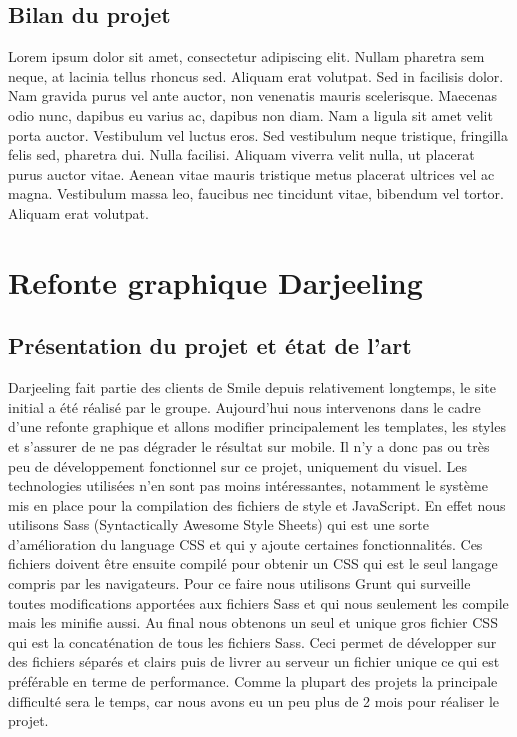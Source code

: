 \documentclass[a4paper,11pt,twoside]{report}
\begin{document}
    \subsection*{Bilan du projet}
    Lorem ipsum dolor sit amet, consectetur adipiscing elit. Nullam pharetra sem neque, at lacinia tellus rhoncus sed. Aliquam erat volutpat. Sed in facilisis dolor. Nam gravida purus vel ante auctor, non venenatis mauris scelerisque. Maecenas odio nunc, dapibus eu varius ac, dapibus non diam. Nam a ligula sit amet velit porta auctor. Vestibulum vel luctus eros. Sed vestibulum neque tristique, fringilla felis sed, pharetra dui. Nulla facilisi. Aliquam viverra velit nulla, ut placerat purus auctor vitae. Aenean vitae mauris tristique metus placerat ultrices vel ac magna. Vestibulum massa leo, faucibus nec tincidunt vitae, bibendum vel tortor. Aliquam erat volutpat.

    \newpage
    
  \section{Refonte graphique Darjeeling}
    \subsection*{Présentation du projet et état de l'art}
    Darjeeling fait partie des clients de Smile depuis relativement longtemps, le site initial a été réalisé par le groupe. Aujourd'hui nous intervenons dans le cadre d'une refonte graphique et allons modifier principalement les templates, les styles et s'assurer de ne pas dégrader le résultat sur mobile. Il n'y a donc pas ou très peu de développement fonctionnel sur ce projet, uniquement du visuel. Les technologies utilisées n'en sont pas moins intéressantes, notamment le système mis en place pour la compilation des fichiers de style et JavaScript. En effet nous utilisons Sass (Syntactically Awesome Style Sheets) qui est une sorte d'amélioration du language CSS et qui y ajoute certaines fonctionnalités. Ces fichiers doivent être ensuite compilé pour obtenir un CSS qui est le seul langage compris par les navigateurs. Pour ce faire nous utilisons Grunt qui surveille toutes modifications apportées aux fichiers Sass et qui nous seulement les compile mais les minifie aussi. Au final nous obtenons un seul et unique gros fichier CSS qui est la concaténation de tous les fichiers Sass. Ceci permet de développer sur des fichiers séparés et clairs puis de livrer au serveur un fichier unique ce qui est préférable en terme de performance. Comme la plupart des projets la principale difficulté sera le temps, car nous avons eu un peu plus de 2 mois pour réaliser le projet.
\end{document}
